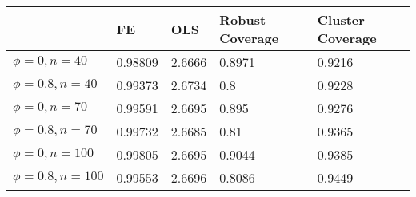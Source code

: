 \begin{tabular}{lllll}
& FE & OLS & Robust Coverage & Cluster Coverage \\ 
\hline 
$\phi=0,n=40$ & 0.98809 & 2.6666 & 0.8971 & 0.9216 \\ 
$\phi=0.8,n=40$ & 0.99373 & 2.6734 & 0.8 & 0.9228 \\ 
$\phi=0,n=70$ & 0.99591 & 2.6695 & 0.895 & 0.9276 \\ 
$\phi=0.8,n=70$ & 0.99732 & 2.6685 & 0.81 & 0.9365 \\ 
$\phi=0,n=100$ & 0.99805 & 2.6695 & 0.9044 & 0.9385 \\ 
$\phi=0.8,n=100$ & 0.99553 & 2.6696 & 0.8086 & 0.9449 \\ 
\hline 
\end{tabular}